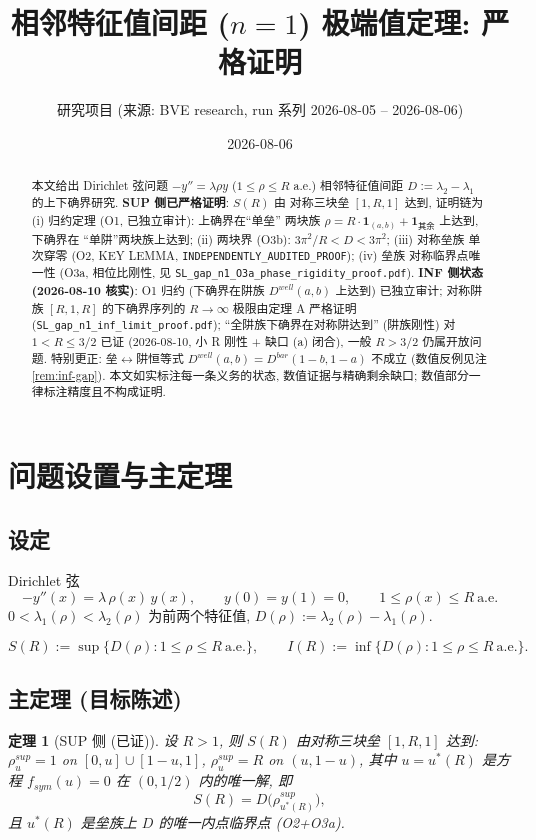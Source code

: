 \documentclass[UTF8]{ctexart}
\title{相邻特征值间距 ($n=1$) 极端值定理: 严格证明}
\author{研究项目 (来源: BVE research, run 系列 2026-08-05 -- 2026-08-06)}
\date{2026-08-06}
\newtheorem{theorem}{定理}[section]
\begin{document}
\maketitle

\begin{abstract}
本文给出 Dirichlet 弦问题 $-y''=\lambda\rho y$ ($1\le\rho\le R$ a.e.) 相邻特征值间距
$D:=\lambda_2-\lambda_1$ 的上下确界研究. \textbf{SUP 侧已严格证明}: $S(R)$ 由
对称三块垒 $[1,R,1]$ 达到, 证明链为 (i) 归约定理 (O1, 已独立审计): 上确界在``单垒''
两块族 $\rho=R\cdot\mathbf 1_{(a,b)}+\mathbf 1_{\text{其余}}$ 上达到, 下确界在
``单阱''两块族上达到; (ii) 两块界 (O3b): $3\pi^2/R<D<3\pi^2$; (iii) 对称垒族
单次穿零 (O2, KEY LEMMA, \texttt{INDEPENDENTLY\_AUDITED\_PROOF}); (iv) 垒族
对称临界点唯一性 (O3a, 相位比刚性, 见 \texttt{SL\_gap\_n1\_O3a\_phase\_rigidity\_proof.pdf}).
\textbf{INF 侧状态 (2026-08-10 核实)}: O1 归约 (下确界在阱族 $D^{well}(a,b)$ 上达到)
已独立审计; 对称阱族 $[R,1,R]$ 的下确界序列的 $R\to\infty$ 极限由定理 A 严格证明
(\texttt{SL\_gap\_n1\_inf\_limit\_proof.pdf}); ``全阱族下确界在对称阱达到'' (阱族刚性) 对 $1<R\le3/2$ 已证 (2026-08-10, 小 R 刚性 + 缺口 (a) 闭合), 一般 $R>3/2$ 仍属开放问题. 特别更正: 垒$\leftrightarrow$阱恒等式
$D^{well}(a,b)=D^{bar}(1-b,1-a)$ 不成立 (数值反例见注 \ref{rem:inf-gap}).
本文如实标注每一条义务的状态, 数值证据与精确剩余缺口; 数值部分一律标注精度且不构成证明.
\end{abstract}

\tableofcontents

\section{问题设置与主定理}

\subsection{设定}
Dirichlet 弦
\begin{equation}
	-y''(x) = \lambda\,\rho(x)\,y(x),\qquad y(0)=y(1)=0,\qquad
	1\le\rho(x)\le R\ \text{a.e.}
\end{equation}
$0<\lambda_1(\rho)<\lambda_2(\rho)$ 为前两个特征值, $D(\rho):=\lambda_2(\rho)-\lambda_1(\rho)$.

\begin{equation}
	S(R):=\sup\{D(\rho):1\le\rho\le R\ \text{a.e.}\},\qquad
	I(R):=\inf\{D(\rho):1\le\rho\le R\ \text{a.e.}\}.
\end{equation}

\subsection{主定理 (目标陈述)}
\begin{theorem}[SUP 侧 (已证)]
设 $R>1$, 则 $S(R)$ 由对称三块垒 $[1,R,1]$ 达到:
$\rho^{sup}_u = 1$ on $[0,u]\cup[1-u,1]$, $\rho^{sup}_u=R$ on $(u,1-u)$,
其中 $u=u^*(R)$ 是方程 $f_{sym}(u)=0$ 在 $(0,1/2)$ 内的唯一解, 即
\begin{equation}
	S(R)=D\bigl(\rho^{sup}_{u^*(R)}\bigr),
\end{equation}
且 $u^*(R)$ 是垒族上 $D$ 的唯一内点临界点 (O2+O3a).
\end{theorem}
\end{document}
